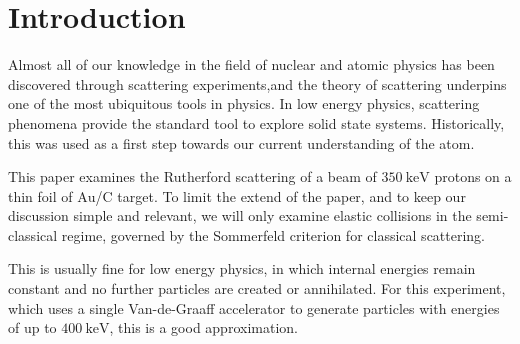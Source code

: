 \section{Introduction} 
Almost all of our knowledge in the field of nuclear and atomic physics has been discovered through scattering experiments,and the theory of scattering underpins one of the most ubiquitous tools in physics.
In low energy physics, scattering phenomena provide the standard tool to
explore solid state systems. Historically, this was used as a first step
towards our current understanding of the atom.

This paper examines the Rutherford scattering of a beam of $\SI{350}{\kilo\electronvolt}$ protons on a thin foil of $\mathrm{Au}$/$\mathrm{C}$ target. To limit the extend of the paper, and to keep our discussion simple and relevant, we will only examine elastic collisions in the semi-classical regime, governed by the Sommerfeld criterion for classical scattering. \cite[p. 14]{noteBB}

This is usually fine for low energy physics, in which internal energies remain
constant and no further particles are created or annihilated.
For this experiment, which uses a single Van-de-Graaff accelerator to generate particles with energies of up to $\SI{400}{\kilo\electronvolt}$, this is a good approximation.



